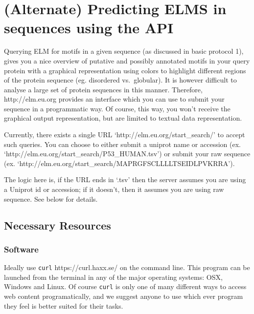 \section{(Alternate) Predicting ELMS in sequences using the API}
\label{sec:predicting_REST}

Querying ELM for motifs in a given sequence (as discussed in basic
protocol 1), gives you a nice overview of putative and possibly
annotated motifs in your query protein with a graphical representation
using colors to highlight different regions of the protein sequence (eg.
disordered vs.~globular). It is however difficult to analyse a large set
of protein sequences in this manner. Therefore, http://elm.eu.org
provides an interface which you can use to submit your sequence in a
programmatic way. Of course, this way, you won't receive the graphical
output representation, but are limited to textual data representation.

Currently, there exists a single URL `http://elm.eu.org/start\_search/'
to accept such queries. You can choose to either submit a uniprot name
or accession (ex. `http://elm.eu.org/start\_search/P53\_HUMAN.tsv') or
submit your raw sequence (ex.
`http://elm.eu.org/start\_search/MAPRGFSCLLLLTSEIDLPVKRRA').

The logic here is, if the URL ends in `.tsv' then the server assumes you
are using a Uniprot id or accession; if it doesn't, then it assumes you
are using raw sequence. See below for details.

%
%
\subsection{Necessary Resources}

\subsubsection{Software}

Ideally use \texttt{curl} https://curl.haxx.se/ on the command line.
This program can be launched from the terminal in any of the major
operating systems: OSX, Windows and Linux. Of course \texttt{curl} is
only one of many different ways to access web content programatically,
and we suggest anyone to use which ever program they feel is better
suited for their tasks.

